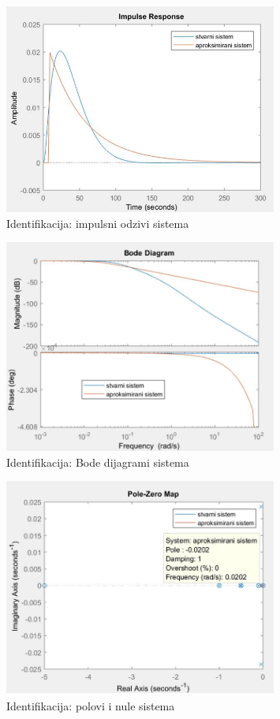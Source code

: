 \begin{figure} [H]
  \centering
  \includegraphics[width=0.8\textwidth]{z2_7}
  \caption{Identifikacija: impulsni odzivi sistema}
  \label{fig:z2_7}
\end{figure}

\begin{figure} [H]
  \centering
  \includegraphics[width=0.8\textwidth]{z2_8}
  \caption{Identifikacija: Bode dijagrami sistema}
  \label{fig:z2_8}
\end{figure}
 
 \begin{figure} [H]
  \centering
  \includegraphics[width=0.8\textwidth]{z2_9}
  \caption{Identifikacija: polovi i nule sistema}
  \label{fig:z2_9}
\end{figure}

